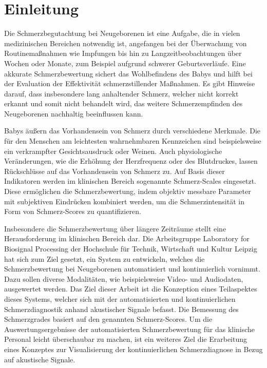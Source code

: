 \chapter{Einleitung}

Die Schmerzbegutachtung bei Neugeborenen ist eine Aufgabe, die in vielen medizinischen Bereichen notwendig ist, angefangen bei der Überwachung von Routinemaßnahmen wie Impfungen bis hin zu Langzeitbeobachtungen über Wochen oder Monate, zum Beispiel aufgrund schwerer Geburtsverläufe. Eine akkurate Schmerzbewertung sichert das Wohlbefindens des Babys und hilft bei der Evaluation der Effektivität schmerzstillender Maßnahmen. Es gibt Hinweise darauf, dass insbesondere lang anhaltender Schmerz, welcher nicht korrekt erkannt und somit nicht behandelt wird, das weitere Schmerzempfinden des Neugeborenen nachhaltig beeinflussen kann.\cite[S. 402 - 403]{PainAssessment03} \cite[S. 439]{PainAssessment01}

Babys äußern das Vorhandensein von Schmerz durch verschiedene Merkmale. Die für den Menschen am leichtesten wahrnehmbaren Kennzeichen sind beispielsweise ein verkrampfter Gesichtsausdruck oder Weinen. Auch physiologische Veränderungen, wie die Erhöhung der Herzfrequenz oder des Blutdruckes, lassen Rückschlüsse auf das Vorhandensein von Schmerz zu.\cite[S. 440]{PainAssessment01} Auf Basis dieser Indikatoren werden im klinischen Bereich sogenannte Schmerz-Scales eingesetzt. Diese ermöglichen die Schmerzbewertung, indem objektiv messbare Parameter mit subjektiven Eindrücken kombiniert werden, um die Schmerzintensität in Form von Schmerz-Scores zu quantifizieren.\cite[S. 100 - 101]{painInNeonates}


Insbesondere die Schmerzbewertung über längere Zeiträume stellt eine Herausforderung im klinischen Bereich dar.\cite[S. 240]{painAssessmentStatus} Die Arbeitsgruppe \glqq Laboratory for Biosignal Processing\grqq{} der Hochschule für Technik, Wirtschaft und Kultur Leipzig hat sich zum Ziel gesetzt, ein System zu entwickeln, welches die Schmerzbewertung bei Neugeborenen automatisiert und kontinuierlich vornimmt. Dazu sollen diverse Modalitäten, wie beispielsweise Video- und Audiodaten, ausgewertet werden. Das Ziel dieser Arbeit ist die Konzeption eines Teilaspektes dieses Systems, welcher sich mit der automatisierten und kontinuierlichen Schmerzdiagnostik anhand akustischer Signale befasst. Die Bemessung des Schmerzgrades basiert auf den genannten Schmerz-Scores. Um die Auswertungsergebnisse der automatisierten Schmerzbewertung für das klinische Personal leicht überschaubar zu machen, ist ein weiteres Ziel die Erarbeitung eines Konzeptes zur Visualisierung der kontinuierlichen Schmerzdiagnose in Bezug auf akustische Signale.

